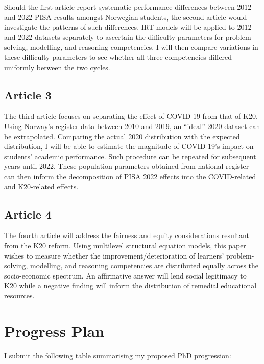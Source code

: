 \documentclass[
    a4paper,                %
    11pt,                   %
    stu,                    %
    donotrepeattitle,       %
    floatsintext,           %
    biblatex,               %
    colorlinks=true,        %
    linkcolor=red,          %
    anchorcolor=black,      %
    citecolor=blue,         %
    urlcolor=blue,          %
    bookmarks=true,         %
    bookmarksopen=false,    %
    bookmarksnumbered=true, %
    dvipsnames              %
]{apa7}
\begin{document}
Should the first article report systematic performance differences between 2012 and 2022 PISA results amongst Norwegian students, the second article would investigate the patterns of such differences. IRT models will be applied to 2012 and 2022 datasets separately to ascertain the difficulty parameters for problem-solving, modelling, and reasoning competencies. I will then compare variations in these difficulty parameters to see whether all three competencies differed uniformly between the two cycles.

\subsection{Article 3}

The third article focuses on separating the effect of COVID-19 from that of K20. Using Norway's register data between 2010 and 2019, an ``ideal'' 2020 dataset can be extrapolated. Comparing the actual 2020 distribution with the expected distribution, I will be able to estimate the magnitude of COVID-19's impact on students' academic performance. Such procedure can be repeated for subsequent years until 2022. These population parameters obtained from national register can then inform the decomposition of PISA 2022 effects into the COVID-related and K20-related effects.

\subsection{Article 4}

The fourth article will address the fairness and equity considerations resultant from the K20 reform. Using multilevel structural equation models, this paper wishes to measure whether the improvement/deterioration of learners' problem-solving, modelling, and reasoning competencies are distributed equally across the socio-economic spectrum. An affirmative answer will lend social legitimacy to K20 while a negative finding will inform the distribution of remedial educational resources.

\section{Progress Plan}

I submit the following table summarising my proposed PhD progression:
\end{document}
